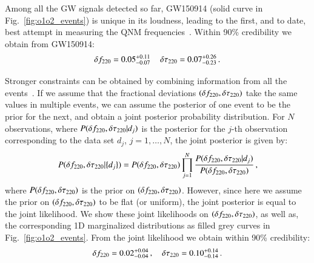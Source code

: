 Among all the GW signals detected so far, GW150914 (solid curve in
Fig.~\ref{fig:o1o2_events}) is unique in its loudness, leading to the
first, and to date, best attempt in measuring the QNM
frequencies~\cite{TheLIGOScientific:2016src,Brito:2018rfr,Carullo:2019flw,Isi:2019aib}. Within
90\% credibility we obtain from GW150914:
%
\begin{equation}\label{GW150914_delta}
\delta f_{\text{220}}=0.05^{+0.11}_{-0.07}\,\quad \delta \tau_{\text{220}}=0.07^{+0.26}_{-0.23}\,.
\end{equation}

Stronger constraints can be obtained by combining information from all the events~\cite{Abbott:2020jks}. If we assume that the fractional deviations $(\delta f_{\text{220}},\delta \tau_{\text{220}})$ take the same values in multiple events, we can assume
the posterior of one event to be the prior for the next, and obtain a
joint posterior probability distribution. For $N$ observations, where
$P(\delta f_{\text{220}}, \delta \tau_{\text{220}} | d_j)$ is the posterior for the $j$-th
observation corresponding to the data set $d_j$, $j=1,\dots,N$, the joint
posterior is given by:
%
\begin{equation}
P(\delta f_{\text{220}}, \delta \tau_{\text{220}} | \{d_j\}) = P(\delta f_{\text{220}}, \delta \tau_{\text{220}}) \prod _{j=1}^N \frac{P(\delta f_{\text{220}}, \delta \tau_{\text{220}} | d_j) }{P(\delta f_{\text{220}}, \delta \tau_{\text{220}})}\,,
\end{equation}
%
where $P(\delta f_{\text{220}}, \delta \tau_{\text{220}})$ is the prior on $(\delta f_{\text{220}},
\delta \tau_{\text{220}})$. However, since here we assume the prior on $(\delta f_{\text{220}},
\delta \tau_{\text{220}})$ to be flat (or uniform), the joint posterior is equal to
the joint likelihood. We show these joint likelihoods on $(\delta f_{\text{220}}, \delta \tau_{\text{220}})$, as well as, the corresponding 1D marginalized distributions as filled grey curves in Fig.~\ref{fig:o1o2_events}. From the joint likelihood we obtain within 90\% credibility: 
%
\begin{equation}
\delta f_{\text{220}}=0.02^{+0.04}_{-0.04}\,,\quad \delta \tau_{\text{220}}=0.10^{+0.14}_{-0.14}\,.
\end{equation}
%

